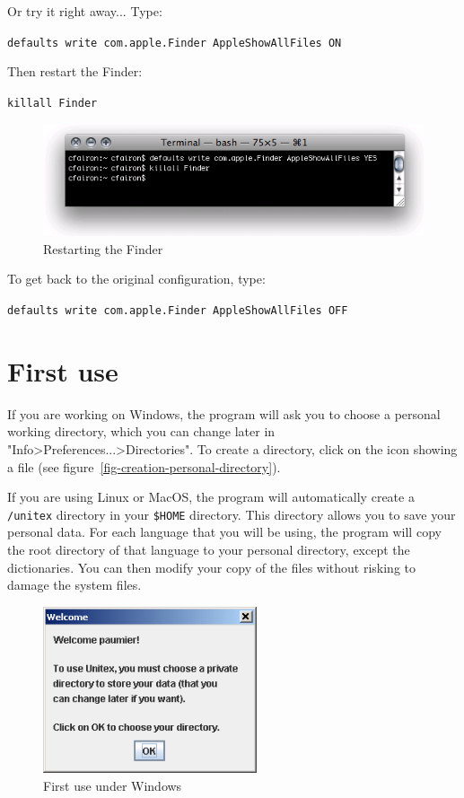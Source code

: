 \bigskip
\noindent Or try it right away... Type: 

\bigskip
\verb+defaults write com.apple.Finder AppleShowAllFiles ON+

\bigskip
\noindent Then restart the Finder:

\bigskip
\verb+killall Finder+

\begin{figure}[!h]
\begin{center}
\includegraphics[width=12cm]{resources/img/fig-mac6.png}
\caption{Restarting the Finder\label{fig-mac6}}
\end{center}
\end{figure}

\bigskip
\noindent To get back to the original configuration, type: 

\bigskip
\verb+defaults write com.apple.Finder AppleShowAllFiles OFF+


\section{First use}
If you are working on Windows, the program will ask you to choose a
 personal working  directory, which you can
change later in "Info>Preferences...>Directories". To create a directory, click
on the icon showing a file (see
figure~\ref{fig-creation-personal-directory}).

\bigskip
\noindent If you are using Linux or MacOS, the program will automatically create a
\verb+/unitex+ directory in your \verb+$HOME+ directory. This directory allows
you to save your personal data. For each language that you will be using, the
program will copy the root directory of that language to your personal
directory, except the dictionaries. You can then modify your copy of the
files without risking to damage the system files.

\begin{figure}[h]
\begin{center}
\includegraphics[width=6.3cm]{resources/img/fig1-1.png}
\caption{First use under Windows}
\end{center}
\end{figure}

